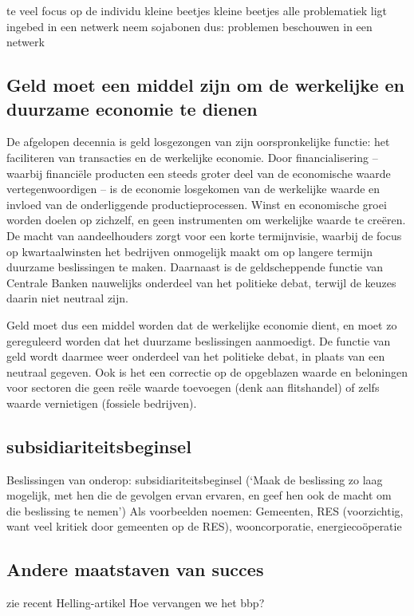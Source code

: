 te veel focus op de individu
kleine beetjes kleine beetjes
alle problematiek ligt ingebed in een netwerk
neem sojabonen
dus: problemen beschouwen in een netwerk

\subsection{Geld moet een middel zijn om de werkelijke en duurzame economie te dienen}
De afgelopen decennia is geld losgezongen van zijn oorspronkelijke functie: het faciliteren van transacties en de werkelijke economie. Door financialisering – waarbij financiële producten een steeds groter deel van de economische waarde vertegenwoordigen – is de economie losgekomen van de werkelijke waarde en invloed van de onderliggende productieprocessen. Winst en economische groei worden doelen op zichzelf, en geen instrumenten om werkelijke waarde te creëren. De macht van aandeelhouders zorgt voor een korte termijnvisie, waarbij de focus op kwartaalwinsten het bedrijven onmogelijk maakt om op langere termijn duurzame beslissingen te maken. Daarnaast is de geldscheppende functie van Centrale Banken nauwelijks onderdeel van het politieke debat, terwijl de keuzes daarin niet neutraal zijn.

Geld moet dus een middel worden dat de werkelijke economie dient, en moet zo gereguleerd worden dat het duurzame beslissingen aanmoedigt. De functie van geld wordt daarmee weer onderdeel van het politieke debat, in plaats van een neutraal gegeven. Ook is het een correctie op de opgeblazen waarde en beloningen voor sectoren die geen reële waarde toevoegen (denk aan flitshandel) of zelfs waarde vernietigen (fossiele bedrijven).

\subsection{subsidiariteitsbeginsel}
Beslissingen van onderop: subsidiariteitsbeginsel (‘Maak de beslissing zo laag mogelijk, met hen die de gevolgen ervan ervaren, en geef hen ook de macht om die beslissing te nemen’)
Als voorbeelden noemen: Gemeenten, RES (voorzichtig, want veel kritiek door gemeenten op de RES), wooncorporatie, energiecoöperatie

\subsection{Andere maatstaven van succes}
zie recent Helling-artikel Hoe vervangen we het bbp?

